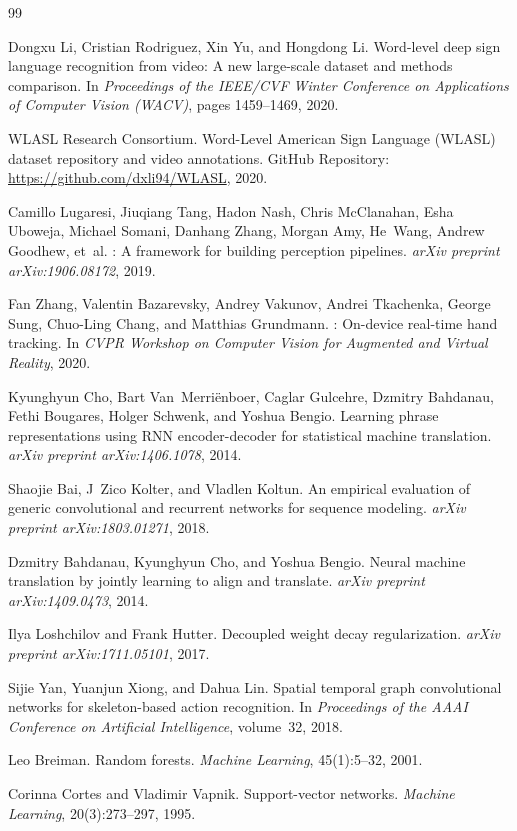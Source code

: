 \documentclass{article}
\begin{document}
\begin{thebibliography}{99}

Dongxu Li, Cristian Rodriguez, Xin Yu, and Hongdong Li.
\newblock Word-level deep sign language recognition from video: A new large-scale dataset and methods comparison.
\newblock In \emph{Proceedings of the IEEE/CVF Winter Conference on Applications of Computer Vision (WACV)}, pages 1459--1469, 2020.

WLASL Research Consortium.
\newblock Word-Level American Sign Language (WLASL) dataset repository and video annotations.
\newblock GitHub Repository: \url{https://github.com/dxli94/WLASL}, 2020.

Camillo Lugaresi, Jiuqiang Tang, Hadon Nash, Chris McClanahan, Esha Uboweja, Michael Somani, Danhang Zhang, Morgan Amy, He~Wang, Andrew Goodhew, et~al.
: A framework for building perception pipelines.
\newblock \emph{arXiv preprint arXiv:1906.08172}, 2019.

Fan Zhang, Valentin Bazarevsky, Andrey Vakunov, Andrei Tkachenka, George Sung, Chuo-Ling Chang, and Matthias Grundmann.
: On-device real-time hand tracking.
\newblock In \emph{CVPR Workshop on Computer Vision for Augmented and Virtual Reality}, 2020.

Kyunghyun Cho, Bart Van~Merri{\"e}nboer, Caglar Gulcehre, Dzmitry Bahdanau, Fethi Bougares, Holger Schwenk, and Yoshua Bengio.
\newblock Learning phrase representations using {RNN} encoder-decoder for statistical machine translation.
\newblock \emph{arXiv preprint arXiv:1406.1078}, 2014.

Shaojie Bai, J~Zico Kolter, and Vladlen Koltun.
\newblock An empirical evaluation of generic convolutional and recurrent networks for sequence modeling.
\newblock \emph{arXiv preprint arXiv:1803.01271}, 2018.

Dzmitry Bahdanau, Kyunghyun Cho, and Yoshua Bengio.
\newblock Neural machine translation by jointly learning to align and translate.
\newblock \emph{arXiv preprint arXiv:1409.0473}, 2014.

Ilya Loshchilov and Frank Hutter.
\newblock Decoupled weight decay regularization.
\newblock \emph{arXiv preprint arXiv:1711.05101}, 2017.

Sijie Yan, Yuanjun Xiong, and Dahua Lin.
\newblock Spatial temporal graph convolutional networks for skeleton-based action recognition.
\newblock In \emph{Proceedings of the AAAI Conference on Artificial Intelligence}, volume~32, 2018.

Leo Breiman.
\newblock Random forests.
\newblock \emph{Machine Learning}, 45(1):5--32, 2001.

Corinna Cortes and Vladimir Vapnik.
\newblock Support-vector networks.
\newblock \emph{Machine Learning}, 20(3):273--297, 1995.

\end{thebibliography}
\end{document}

